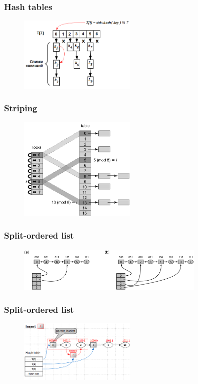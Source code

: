 \documentclass[aspectratio=169, pdf, 8pt, unicode]{beamer}
\begin{document}
\begin{frame}[fragile]
\frametitle{Hash tables}
\begin{figure}[H]
\includegraphics[width=0.5\textwidth]{fig/hashtable.png}
\end{figure}
\end{frame}

\begin{frame}[fragile]
\frametitle{Striping}
\begin{figure}[H]
\includegraphics[width=0.5\textwidth]{fig/striping.png}
\end{figure}
\end{frame}

\begin{frame}[fragile]
\frametitle{Split-ordered list}
\begin{figure}[H]
\includegraphics[width=0.8\textwidth]{fig/split-ordered.png}
\end{figure}
\end{frame}

\begin{frame}[fragile]
\frametitle{Split-ordered list}
\begin{figure}[H]
\includegraphics[width=0.5\textwidth]{fig/split-ordered-1.png}
\end{figure}
\end{frame}
\end{document}
